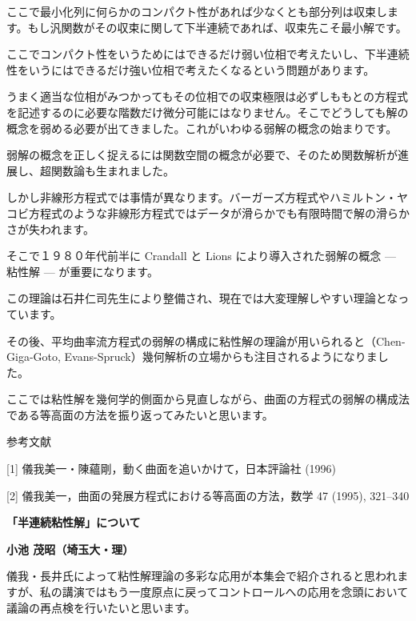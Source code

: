 \documentclass[uplatex,dvipdfmx]{jlreq}
\begin{document}
ここで最小化列に何らかのコンパクト性があれば少なくとも部分列は収束します。もし汎関数がその収束に関して下半連続であれば、収束先こそ最小解です。

ここでコンパクト性をいうためにはできるだけ弱い位相で考えたいし、下半連続性をいうにはできるだけ強い位相で考えたくなるという問題があります。

うまく適当な位相がみつかってもその位相での収束極限は必ずしももとの方程式を記述するのに必要な階数だけ微分可能にはなりません。そこでどうしても解の概念を弱める必要が出てきました。これがいわゆる弱解の概念の始まりです。

弱解の概念を正しく捉えるには関数空間の概念が必要で、そのため関数解析が進展し、超関数論も生まれました。

しかし非線形方程式では事情が異なります。バーガーズ方程式やハミルトン・ヤコビ方程式のような非線形方程式ではデータが滑らかでも有限時間で解の滑らかさが失われます。

そこで１９８０年代前半に Crandall と Lions により導入された弱解の概念 --- 粘性解 --- が重要になります。

この理論は石井仁司先生により整備され、現在では大変理解しやすい理論となっています。

その後、平均曲率流方程式の弱解の構成に粘性解の理論が用いられると（Chen-Giga-Goto, Evans-Spruck）幾何解析の立場からも注目されるようになりました。

ここでは粘性解を幾何学的側面から見直しながら、曲面の方程式の弱解の構成法である等高面の方法を振り返ってみたいと思います。

\bigskip

参考文献

[1] 儀我美一・陳蘊剛，動く曲面を追いかけて，日本評論社 (1996)

[2] 儀我美一，曲面の発展方程式における等高面の方法，数学 47 (1995), 321--340

\newpage


\begin{center}
{\large\bfseries 「半連続粘性解」について}
\end{center}

\begin{flushright}
\textbf{小池 茂昭（埼玉大・理）}
\end{flushright}

儀我・長井氏によって粘性解理論の多彩な応用が本集会で紹介されると思われますが、私の講演ではもう一度原点に戻ってコントロールへの応用を念頭において議論の再点検を行いたいと思います。
\end{document}
